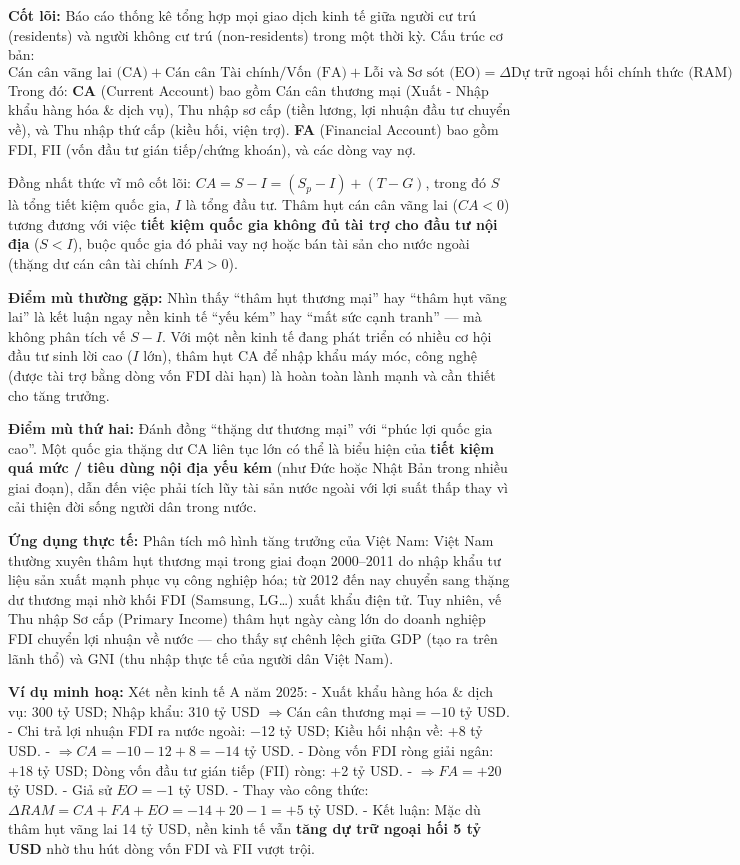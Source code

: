 \documentclass[
]{article}
\begin{document}
\textbf{Cốt lõi:} Báo cáo thống kê tổng hợp mọi giao dịch kinh tế giữa
người cư trú (residents) và người không cư trú (non-residents) trong một
thời kỳ. Cấu trúc cơ bản:
\[ \text{Cán cân vãng lai (CA)} + \text{Cán cân Tài chính/Vốn (FA)} + \text{Lỗi và Sơ sót (EO)} = \Delta \text{Dự trữ ngoại hối chính thức (RAM)} \]
Trong đó: \textbf{CA} (Current Account) bao gồm Cán cân thương mại (Xuất
- Nhập khẩu hàng hóa \& dịch vụ), Thu nhập sơ cấp (tiền lương, lợi nhuận
đầu tư chuyển về), và Thu nhập thứ cấp (kiều hối, viện trợ). \textbf{FA}
(Financial Account) bao gồm FDI, FII (vốn đầu tư gián tiếp/chứng khoán),
và các dòng vay nợ.

Đồng nhất thức vĩ mô cốt lõi: \(CA = S - I = (S_{p} - I) + (T - G)\),
trong đó \(S\) là tổng tiết kiệm quốc gia, \(I\) là tổng đầu tư. Thâm
hụt cán cân vãng lai (\(CA < 0\)) tương đương với việc \textbf{tiết kiệm
quốc gia không đủ tài trợ cho đầu tư nội địa} (\(S < I\)), buộc quốc gia
đó phải vay nợ hoặc bán tài sản cho nước ngoài (thặng dư cán cân tài
chính \(FA > 0\)).

\textbf{Điểm mù thường gặp:} Nhìn thấy ``thâm hụt thương mại'' hay
``thâm hụt vãng lai'' là kết luận ngay nền kinh tế ``yếu kém'' hay ``mất
sức cạnh tranh'' --- mà không phân tích vế \(S - I\). Với một nền kinh
tế đang phát triển có nhiều cơ hội đầu tư sinh lời cao (\(I\) lớn), thâm
hụt CA để nhập khẩu máy móc, công nghệ (được tài trợ bằng dòng vốn FDI
dài hạn) là hoàn toàn lành mạnh và cần thiết cho tăng trưởng.

\textbf{Điểm mù thứ hai:} Đánh đồng ``thặng dư thương mại'' với ``phúc
lợi quốc gia cao''. Một quốc gia thặng dư CA liên tục lớn có thể là biểu
hiện của \textbf{tiết kiệm quá mức / tiêu dùng nội địa yếu kém} (như Đức
hoặc Nhật Bản trong nhiều giai đoạn), dẫn đến việc phải tích lũy tài sản
nước ngoài với lợi suất thấp thay vì cải thiện đời sống người dân trong
nước.

\textbf{Ứng dụng thực tế:} Phân tích mô hình tăng trưởng của Việt Nam:
Việt Nam thường xuyên thâm hụt thương mại trong giai đoạn 2000--2011 do
nhập khẩu tư liệu sản xuất mạnh phục vụ công nghiệp hóa; từ 2012 đến nay
chuyển sang thặng dư thương mại nhờ khối FDI (Samsung, LG\ldots) xuất
khẩu điện tử. Tuy nhiên, vế Thu nhập Sơ cấp (Primary Income) thâm hụt
ngày càng lớn do doanh nghiệp FDI chuyển lợi nhuận về nước --- cho thấy
sự chênh lệch giữa GDP (tạo ra trên lãnh thổ) và GNI (thu nhập thực tế
của người dân Việt Nam).

\textbf{Ví dụ minh hoạ:} Xét nền kinh tế A năm 2025: - Xuất khẩu hàng
hóa \& dịch vụ: 300 tỷ USD; Nhập khẩu: 310 tỷ USD
\(\Rightarrow \text{Cán cân thương mại} = -10\) tỷ USD. - Chi trả lợi
nhuận FDI ra nước ngoài: −12 tỷ USD; Kiều hối nhận về: +8 tỷ USD. -
\(\Rightarrow CA = -10 - 12 + 8 = -14\) tỷ USD. - Dòng vốn FDI ròng giải
ngân: +18 tỷ USD; Dòng vốn đầu tư gián tiếp (FII) ròng: +2 tỷ USD. -
\(\Rightarrow FA = +20\) tỷ USD. - Giả sử \(EO = -1\) tỷ USD. - Thay vào
công thức: \(\Delta RAM = CA + FA + EO = -14 + 20 - 1 = +5\) tỷ USD. -
Kết luận: Mặc dù thâm hụt vãng lai 14 tỷ USD, nền kinh tế vẫn
\textbf{tăng dự trữ ngoại hối 5 tỷ USD} nhờ thu hút dòng vốn FDI và FII
vượt trội.
\end{document}
